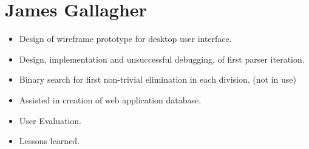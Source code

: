 \section{James Gallagher}

\begin{itemize}
\item Design of wireframe prototype for desktop user interface.
\item Design, implementation and unsuccessful debugging, of first parser iteration.
\item Binary search for first non-trivial elimination in each division. (not in use)
\item Assisted in creation of web application database. 
\item User Evaluation. 
\item Lessons learned. 
 
\end{itemize}
